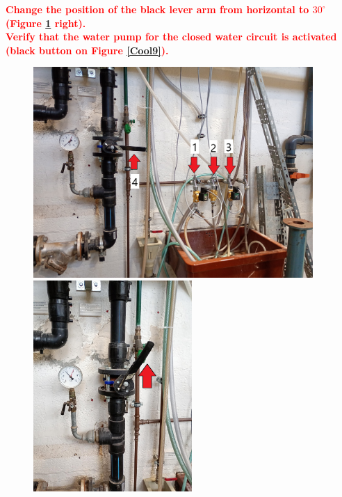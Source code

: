 \documentclass[fleqn,a4paper,20pt]{article}
\begin{document}
\textcolor{red}{\textbf{Change the position of the black lever arm from horizontal to $30^\circ$ (Figure \ref{Cool2} right).}}\\

\textcolor{red}{\textbf{Verify that the water pump for the closed water circuit is activated (black button on Figure \ref{Cool9}).}}\\


\begin{figure}[!h]
	\centering
	\includegraphics[height=8cm]{Cool2}
	\includegraphics[height=8cm]{Cool5}
	\captionsetup{width=0.8\textwidth}
	\label{Cool2}
\end{figure}
\end{document}
